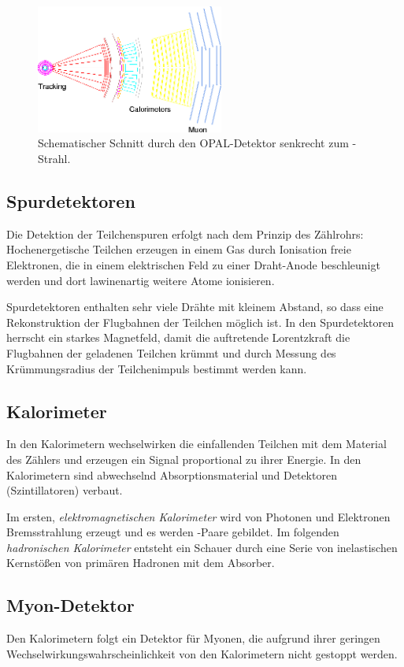 \begin{figure}[H]
\begin{center}
  \includegraphics[width=0.55\textwidth]{../img/opalslice_tr.png}
  \caption{Schematischer Schnitt durch den OPAL-Detektor senkrecht zum \mbox{\ee-Strahl}\protect\footnotemark.}
  \label{img:schnitt}
\end{center}
\end{figure} 

\subsection*{Spurdetektoren}
Die Detektion der Teilchenspuren erfolgt nach dem Prinzip des Zählrohrs:
Hochenergetische Teilchen erzeugen in einem Gas durch Ionisation freie Elektronen,
die in einem elektrischen Feld zu einer Draht-Anode beschleunigt werden und
dort lawinenartig weitere Atome ionisieren.

Spurdetektoren enthalten sehr viele Drähte mit kleinem Abstand,
so dass eine Rekonstruktion der Flugbahnen der Teilchen möglich ist.
In den Spurdetektoren herrscht ein starkes Magnetfeld,
damit die auftretende Lorentzkraft die Flugbahnen der geladenen Teilchen krümmt
und durch Messung des Krümmungsradius der Teilchenimpuls bestimmt werden kann.

\subsection*{Kalorimeter}
In den Kalorimetern wechselwirken die einfallenden Teilchen mit dem Material des Zählers
und erzeugen ein Signal proportional zu ihrer Energie.
In den Kalorimetern sind abwechselnd Absorptionsmaterial und Detektoren (Szintillatoren) verbaut.

Im ersten, \emph{elektromagnetischen Kalorimeter} wird von Photonen und Elektronen Brems\-strah\-lung erzeugt
und es werden \mbox{\ee-Paare} gebildet.
Im folgenden \emph{hadronischen Kalorimeter} entsteht ein Schauer durch eine Serie von inelastischen Kernstößen
von primären Hadronen mit dem Absorber.

\subsection*{Myon-Detektor}
Den Kalorimetern folgt ein Detektor für Myonen, die aufgrund ihrer geringen Wechselwirkungswahrscheinlichkeit
von den Kalorimetern nicht gestoppt werden.

